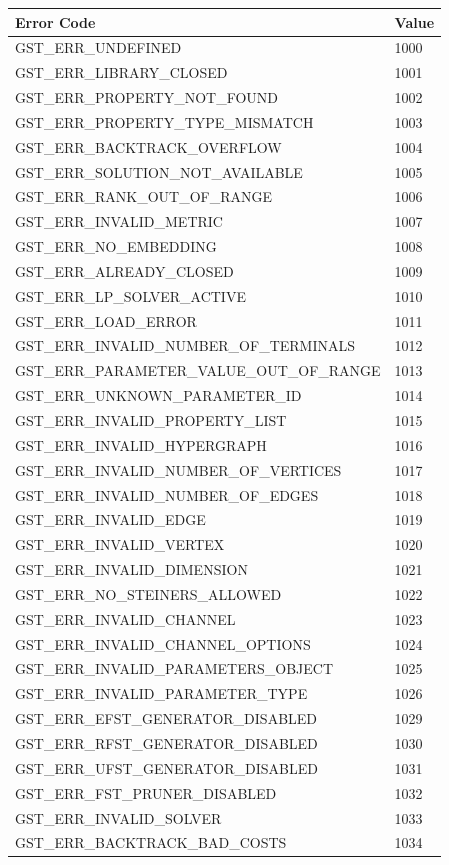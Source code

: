 \begin{tabular}{|l|l|}
\hline
Error Code & Value \\
\hline
GST\_ERR\_UNDEFINED & 1000 \\
GST\_ERR\_LIBRARY\_CLOSED & 1001 \\
GST\_ERR\_PROPERTY\_NOT\_FOUND & 1002 \\
GST\_ERR\_PROPERTY\_TYPE\_MISMATCH & 1003 \\
GST\_ERR\_BACKTRACK\_OVERFLOW & 1004 \\
GST\_ERR\_SOLUTION\_NOT\_AVAILABLE & 1005 \\
GST\_ERR\_RANK\_OUT\_OF\_RANGE & 1006 \\
GST\_ERR\_INVALID\_METRIC & 1007 \\
GST\_ERR\_NO\_EMBEDDING & 1008 \\
GST\_ERR\_ALREADY\_CLOSED & 1009 \\
GST\_ERR\_LP\_SOLVER\_ACTIVE & 1010 \\
GST\_ERR\_LOAD\_ERROR & 1011 \\
GST\_ERR\_INVALID\_NUMBER\_OF\_TERMINALS & 1012 \\
GST\_ERR\_PARAMETER\_VALUE\_OUT\_OF\_RANGE & 1013 \\
GST\_ERR\_UNKNOWN\_PARAMETER\_ID & 1014 \\
GST\_ERR\_INVALID\_PROPERTY\_LIST & 1015 \\
GST\_ERR\_INVALID\_HYPERGRAPH & 1016 \\
GST\_ERR\_INVALID\_NUMBER\_OF\_VERTICES & 1017 \\
GST\_ERR\_INVALID\_NUMBER\_OF\_EDGES & 1018 \\
GST\_ERR\_INVALID\_EDGE & 1019 \\
GST\_ERR\_INVALID\_VERTEX & 1020 \\
GST\_ERR\_INVALID\_DIMENSION & 1021 \\
GST\_ERR\_NO\_STEINERS\_ALLOWED & 1022 \\
GST\_ERR\_INVALID\_CHANNEL & 1023 \\
GST\_ERR\_INVALID\_CHANNEL\_OPTIONS & 1024 \\
GST\_ERR\_INVALID\_PARAMETERS\_OBJECT & 1025 \\
GST\_ERR\_INVALID\_PARAMETER\_TYPE & 1026 \\
GST\_ERR\_EFST\_GENERATOR\_DISABLED & 1029 \\
GST\_ERR\_RFST\_GENERATOR\_DISABLED & 1030 \\
GST\_ERR\_UFST\_GENERATOR\_DISABLED & 1031 \\
GST\_ERR\_FST\_PRUNER\_DISABLED & 1032 \\
GST\_ERR\_INVALID\_SOLVER & 1033 \\
GST\_ERR\_BACKTRACK\_BAD\_COSTS & 1034 \\
\hline
\end{tabular}
